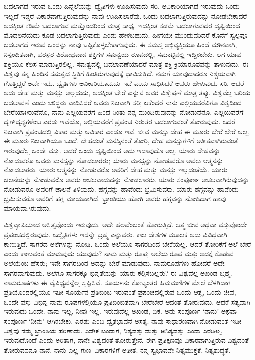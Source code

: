 \vskip 0.2cm

ಬದಲಾಗದೆ ಇರುವ ಒಂದು ಹಿನ್ನೆಲೆಯನ್ನು ದ್ವೈತಿಗಳು ಊಹಿಸುವುದು ಸರಿ. ಅವಿಕಾರಿಯಾಗದೆ ಇರುವುದು ಒಂದು ಇಲ್ಲದೆ ಇದ್ದರೆ ವಿಕಾರವಾಗುತ್ತಿರುವುದನ್ನು ನಾವು ಊಹಿಸಲಾರೆವು. ಒಂದು ಬದಲಾಗುತ್ತಿರುವುದನ್ನು ನೋಡಬೇಕಾದರೆ ಅದಕ್ಕಿಂತ ಕಡಿಮೆ ಬದಲಾಗುವ ಮತ್ತೊಂದರಿಂದ ಮಾತ್ರ ಸಾಧ್ಯ. ಇದಕ್ಕಿಂತ ಕಡಮೆ ಬದಲಾಗುವುದರ ದೃಷ್ಟಿಯಿಂದ ಮೊದಲನೆಯದು ಕೂಡ ಬದಲಾಗುತ್ತಿರುವುದು ಎಂದು ಹೇಳಬಹುದು. ಹೀಗೆಯೇ ಮುಂದುವರಿದರೆ ಕೊನೆಗೆ ಸ್ವಲ್ಪವೂ ಬದಲಾಗದೆ ಇರುವ ಒಂದನ್ನು ನಾವು ಒಪ್ಪಿಕೊಳ್ಳಬೇಕಾಗುವುದು. ಈ ಸಮಸ್ತ ಅಭಿವ್ಯಕ್ತಿಯೂ ಹಿಂದೆ ಮೌನವಾಗಿ, ನಿಸ್ಪಂದಿತವಾಗಿ, ಪರಸ್ಪರ ವಿರೋಧವಾದ ಶಕ್ತಿಗಳ ಸಮನ್ವಯ ರೂಪದಲ್ಲಿ, ಸಮಕಟ್ಟಿನಲ್ಲಿ ಇದ್ದಿರಬೇಕು. ಆಗ ಯಾವ ಶಕ್ತಿಯೂ ಕೆಲಸ ಮಾಡುತ್ತಿರಲಿಲ್ಲ. ಸಮತ್ವದಲ್ಲಿ ಬದಲಾವಣೆಯಾದರೆ ಮಾತ್ರ ಶಕ್ತಿ ಕ್ರಿಯಾರೂಪವನ್ನು ತಾಳುವುದು. ಈ ವಿಶ್ವವು ತನ್ನ ಹಿಂದಿನ ಸಮತ್ವದ ಸ್ಥಿತಿಗೆ ಹಿಂತಿರುಗುವುದಕ್ಕೆ ಧಾವಿಸುತ್ತಿದೆ. ನಮಗೆ ಯಾವುದಾದರೂ ನಿಶ್ಚಯವಾಗಿ ಗೊತ್ತಿದ್ದರೆ ಅದೇ ಇದು. ದ್ವೈತಿಗಳು ಅವಿಕಾರಿಯಾದುದು ಇದೆ ಎಂದು ಸಾಧಿಸಿದರೆ ಅವರು ಹೇಳುವುದು ಸರಿ. ಆದರೆ ಅದು ದೇಹ ಮತ್ತು ಮನಸ್ಸು ಅಲ್ಲದುದು, ಅದಕ್ಕಿಂತ ಬೇರೆ ಎನ್ನುವ ಅವರ ವಿಶ್ಲೇಷಣೆ ಮಾತ್ರ ತಪ್ಪು. ವಿಶ್ವವೆಲ್ಲ ಬರಿಯ ಬದಲಾವಣೆ ಎಂದು ಬೌದ್ಧರು ವಾದಿಸಿದರೆ ಅವರು ನಿಜವಾಗಿ ಸರಿ; ಏಕೆಂದರೆ ನಾನು ಎಲ್ಲಿಯವರೆವಿಗೂ ವಿಶ್ವದಿಂದ ಬೇರೆಯಾಗಿರುವೆನೊ, ನಾನು ಎಲ್ಲಿಯವರೆಗೆ ಹಿಂದೆ ನಿಂತು ನನ್ನ ಮುಂದಿರುವುದನ್ನು ನೋಡುವೆನೊ, ಎಲ್ಲಿಯವರೆಗೆ ದೃಗ್​ದೃಶ್ಯಗಳೆಂಬ ಎರಡು ಇವೆಯೊ, ಅಲ್ಲಿಯವರೆಗೆ ಪ್ರಪಂಚ ನಿರಂತರ ಬದಲಾಗುವಂತೆ ತೋರುವುದು. ಆದರೆ ನಿಜವಾಗಿ ಪ್ರಪಂಚದಲ್ಲಿ ವಿಕಾರ ಮತ್ತು ಅವಿಕಾರ ಎರಡೂ ಇವೆ. ಜೀವ ಮನಸ್ಸು ದೇಹ ಈ ಮೂರು ಬೇರೆ ಬೇರೆ ಅಲ್ಲ, ಈ ಮೂರು ನಿಜವಾಗಿಯೂ ಒಂದೆ. ದೇಹದಂತೆ ಮನಸ್ಸಿನಂತೆ ತೋರಿ, ದೇಹ ಮನಸ್ಸುಗಳಿಗೆ ಅತೀತವಾಗಿರುವಂತೆ ಇರುವುದೆಲ್ಲ ಒಂದೇ ವಸ್ತು. ಆದರೆ ಒಂದು ದೃಷ್ಟಿಯಿಂದ ಅದು ಇದಾವುದೊ ಅಲ್ಲ. ಯಾರು ದೇಹವನ್ನು ನೋಡುವರೊ ಅವರು ಮನಸ್ಸನ್ನು ನೋಡಲಾರರು; ಯಾರು ಮನಸ್ಸನ್ನು ನೋಡುವರೊ ಅವರು ಆತ್ಮನನ್ನು ನೋಡಲಾರರು. ಯಾರು ಆತ್ಮನನ್ನು ನೋಡುವರೊ ಅವರಿಗೆ ದೇಹ ಮತ್ತು ಮನಸ್ಸು ಇಲ್ಲದಂತೆಯೆ. ಯಾರು ಚಲನೆಯನ್ನು ನೋಡುವರೊ ಅವರು ಅಚಲವಾದುದನ್ನು ನೋಡಲಾರರು. ಯಾರು ಸಂಪೂರ್ಣ ಅಚಲವಾಗಿರುವುದನ್ನು ನೋಡುವರೊ ಅವರಿಗೆ ಚಾಲನೆ ತಿಳಿಯದು. ಹಗ್ಗವನ್ನು ಹಾವೆಂದು ಭ್ರಮಿಸುವರು. ಯಾರು ಹಗ್ಗವನ್ನು ಹಾವೆಂದು ಭ್ರಮಿಸುವರೊ ಅವರಿಗೆ ಹಗ್ಗ ಮಾಯವಾಗಿದೆ. ಭ್ರಾಂತಿಯು ಹೋಗಿ ಅವರು ಹಗ್ಗವನ್ನು ನೋಡಿದಾಗ ಹಾವು ಮಾಯವಾಗಿರುವುದು.

\vskip 0.2cm

ವಿಶ್ವವ್ಯಾಪಿಯಾದ ಅಸ್ತಿತ್ವವೊಂದು ಇರುವುದು. ಅದೇ ಹಲವೆಂಬಂತೆ ತೋರುತ್ತಿದೆ. ಆತ್ಮ ಜೀವ ಅಥವಾ ವಸ್ತುವೊಂದೇ ಪ್ರಪಂಚದಲ್ಲಿರುವುದು. ಅದ್ವೈತಿಗಳು ಇದನ್ನೇ ಬ್ರಹ್ಮ ಎನ್ನುವರು. ಕಾಲ ದೇಶಗಳ ಮೂಲಕ ಅದು ವಿವಿಧವಾಗಿ ಕಾಣುತ್ತಿದೆ. ಸಾಗರದ ಅಲೆಗಳನ್ನು ನೋಡಿ. ಒಂದು ಅಲೆಯೂ ಸಾಗರದಿಂದ ಬೇರೆಯಲ್ಲ. ಆದರೆ ತೋರಿಕೆಗೆ ಅಲೆ ಬೇರೆ ಎಂದು ಕಾಣುವಂತೆ ಮಾಡುವುದು ಯಾವುದು? ನಾಮ ಮತ್ತು ರೂಪ; ಅಲೆಯ ರೂಪ ಮತ್ತು ಅದಕ್ಕೆ ಕೊಡುವ ಅಲೆಯೆಂಬ ಹೆಸರು; ಇವೇ ಸಾಗರದಿಂದ ಅದನ್ನು ಬೇರೆ ಮಾಡುವುದು. ನಾಮರೂಪಗಳು ಹೋದರೆ ಅದೇ ಸಾಗರವಾಗುವುದು. ಅಲೆಗೂ ಸಾಗರಕ್ಕೂ ಭಿನ್ನತೆಯನ್ನು ಯಾರು ಕಲ್ಪಿಸಬಲ್ಲರು? ಈ ವಿಶ್ವವೆಲ್ಲ ಅಖಂಡ ಬ್ರಹ್ಮ. ನಾಮರೂಪಗಳು ಈ ವೈವಿಧ್ಯವನ್ನೆಲ್ಲ ಸೃಷ್ಟಿಸಿವೆ. ಸೂರ್ಯನು ಕೋಟ್ಯಂತರ ಹಿಮಮಣಿಗಳ ಮೇಲೆ ಬೆಳಗಿದಾಗ ಪ್ರತಿಯೊಂದರಲ್ಲಿಯೂ ಇಡೀ ಸೂರ್ಯನ ಪ್ರತಿಬಿಂಬ ಇರುವಂತೆ ಪ್ರಪಂಚದಲ್ಲಿರುವ ಒಂದು ಆತ್ಮ, ಒಂದು ಜೀವ, ಒಂದೇ ವಸ್ತು ವಿಭಿನ್ನ ನಾಮ ರೂಪಗಳಲ್ಲಿಯೂ ಪ್ರತಿಬಿಂಬಿತವಾಗಿ ಬೇರೆಬೇರೆ ಆದಂತೆ ತೋರುವುದು. ಆದರೆ ಸತ್ಯವಾಗಿ ಇರುವುದು ಒಂದೇ. ನಾನು ಇಲ್ಲ, ನೀವು ಇಲ್ಲ. ಇರುವುದೆಲ್ಲ ಅಖಂಡ, ಏಕ. ಅದು ಸಂಪೂರ್ಣ ‘ನಾನು’ ಅಥವಾ ಸಂಪೂರ್ಣ ‘ನೀನು’ ಆಗಿರಬೇಕು. ಎರಡು ಎಂಬ ದ್ವೈತಭಾವನೆ ಅಸತ್ಯ. ನಾವು ಸಾಧಾರಣವಾಗಿ ನೋಡುವಂತೆ ಇಡೀ ವಿಶ್ವವು ನಮ್ಮ ಭ್ರಾಂತಿಯ ಪರಿಣಾಮ. ವಿವೇಕ ಬಂದಾಗ, ನಿತ್ಯವಸ್ತು ಮತ್ತು ಅನಿತ್ಯವಸ್ತು ಎಂದು ಎರಡಿಲ್ಲ, ಇರುವುದೊಂದೆ ಎಂದು ಅರಿತಾಗ, ನಾನೇ ವಿಶ್ವದಂತೆ ತೋರುತ್ತೇನೆ. ಈಗ ಪ್ರತಿಕ್ಷಣವೂ ವಿಕಾರವಾಗುತ್ತಿರುವ ವಿಶ್ವದಂತೆ ತೋರುವವನೂ ನಾನೆ. ನಾನು ಎಲ್ಲ ಗುಣ–ವಿಕಾರಗಳಿಗೆ ಅತೀತ. ನನ್ನ ಸ್ವಭಾವವೇ ನಿತ್ಯಮುಕ್ತತೆ, ನಿತ್ಯಶುದ್ಧತೆ.

